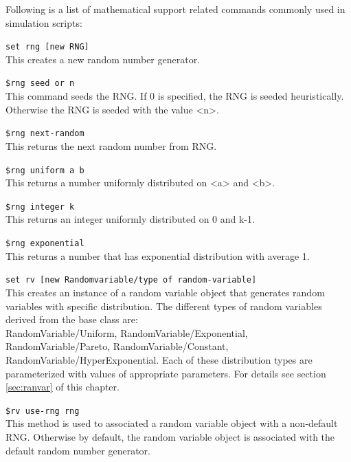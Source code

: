 Following is a list of mathematical support related commands commonly used
in simulation scripts:
\begin{flushleft}
{\tt set rng [new RNG]}\\
This creates a new random number generator.


{\tt \$rng seed  or n\>}\\
This command seeds the RNG. If 0 is specified, the RNG is seeded
heuristically. Otherwise the RNG is seeded with the value <n>.


{\tt \$rng next-random}\\
This returns the next random number from RNG.


{\tt \$rng uniform \<a\> \<b\>}\\
This returns a number uniformly distributed on <a> and <b>.


{\tt \$rng integer \<k\>}\\
This returns an integer uniformly distributed on 0 and k-1.


{\tt \$rng exponential}\\
This returns a number that has exponential distribution with average 1.


{\tt set rv [new Randomvariable/\<type of random-variable\>]}\\
This creates an instance of a random variable object that generates random 
variables with specific distribution. The different types of random 
variables derived from the base class are:\\
RandomVariable/Uniform, RandomVariable/Exponential, RandomVariable/Pareto,
RandomVariable/Constant, RandomVariable/HyperExponential.
Each of these distribution types are parameterized with values of
appropriate parameters. For details see section \ref{sec:ranvar} of this
chapter.


{\tt \$rv use-rng \<rng\>}\\
This method is used to associated a random variable object with a
non-default RNG. Otherwise by default, the random variable object is
associated with the default random number generator.


\end{flushleft}




